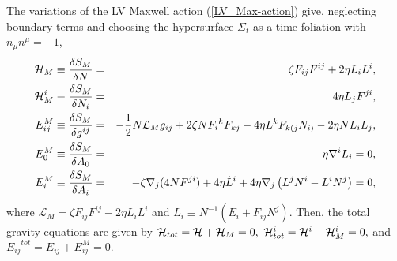 \documentclass[preprint,aps,tightenlines,showkeys,nofootinbib,superscriptaddress]{revtex4}
\newcommand{\beq}{\begin{eqnarray}}
\newcommand{\eeq}{\end{eqnarray}}
\newcommand{\Si}{{\Sigma}}
\begin{document}
The variations of the LV Maxwell action (\ref{LV_Max-action}) give, neglecting boundary terms and choosing the hypersurface $\Si_t$ as a time-foliation with $n_{\mu}n^{\mu}=-1$,
\beq
{\cal H}_M\equiv \frac{\delta S_{M}}{\delta N}&=&\zeta F_{ij}F^{ij}+2 \eta L_{i}L^{i},\\
{\cal H}^i_{M}\equiv \frac{\delta S_{M}}{\delta N_{i}}&=&4\eta L_{j}F^{ji}, \\
E_{ij}^M \equiv \frac{\delta S_{M}}{\delta g^{ij}}&=&-\frac{1}{2}N\mathcal{L}_M g_{ij}+2\zeta N F_{i}{}^{k}F_{kj}-4\eta  L^{k}F_{k(j}N_{i)}-2 \eta N L_{i}L_{j},\\
E_{0}^M \equiv \frac{\delta S_{M}}{\delta A_{0}}&=&\eta \nabla^{i}L_{i}=0,\\
E_{i}^M \equiv\frac{\delta S_{M}}{\delta A_{i}}&=& -\zeta \nabla_{j}(4N F^{ji})+4 \eta \dot L^{i}+4 \eta \nabla_{j}\left(L^{j}N^{i}-L^{i}N^{j}\right)=0,\\
\eeq
where $\mathcal{L}_M=\zeta F_{ij}F^{ij}-2 \eta L_{i}L^{i} $ and $L_{i}\equiv N^{-1} \left(E_{i}+F_{ij}N^{j}\right)$. Then, the total gravity equations are given by ${\cal H}_{tot}={\cal H}+{\cal H}_M=0,~ {\cal H}^i_{tot}={\cal H}^i+{\cal H}^i_{M}=0,$ and ${E_{ij}}^{tot}=E_{ij}+E_{ij}^M=0.$

\newcommand{\J}[4]{#1 {\bf #2} #3 (#4)}
\newcommand{\andJ}[3]{{\bf #1} (#2) #3}
\newcommand{\AP}{Ann. Phys. (N.Y.)}
\newcommand{\MPL}{Mod. Phys. Lett.}
\newcommand{\NP}{Nucl. Phys.}
\newcommand{\PL}{Phys. Lett.}
\newcommand{\PR}{Phys. Rev. D}
\newcommand{\PRL}{Phys. Rev. Lett.}
\newcommand{\PTP}{Prog. Theor. Phys.}
\newcommand{\hep}[1]{ hep-th/{#1}}
\newcommand{\hepp}[1]{ hep-ph/{#1}}
\newcommand{\hepg}[1]{ gr-qc/{#1}}
\newcommand{\bi}{ \bibitem}
\end{document}
